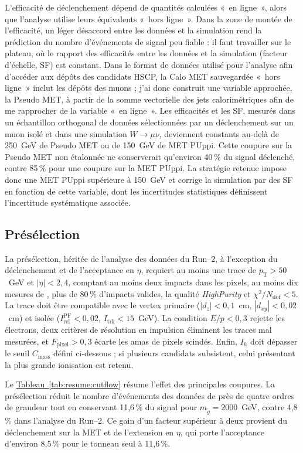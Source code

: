 L'efficacité de déclenchement dépend de quantités calculées «~en ligne~», alors que l'analyse utilise leurs équivalents «~hors ligne~». Dans la zone de montée de l'efficacité, un léger désaccord entre les données et la simulation rend la prédiction du nombre d'événements de signal peu fiable : il faut travailler sur le plateau, où le rapport des efficacités entre les données et la simulation (facteur d'échelle, SF) est constant. Dans le format de données utilisé pour l'analyse afin d'accéder aux dépôts \dedx des candidats HSCP, la Calo MET sauvegardée «~hors ligne~» inclut les dépôts des muons ; j'ai donc construit une variable approchée, la Pseudo MET, à partir de la somme vectorielle des jets calorimétriques afin de me rapprocher de la variable «~en ligne~». Les efficacités et les SF, mesurés dans un échantillon orthogonal de données sélectionnées par un déclenchement sur un muon isolé et dans une simulation $W\to\mu\nu$, deviennent constants au-delà de 250~GeV de Pseudo MET ou de 150~GeV de MET PUppi. Cette coupure sur la Pseudo MET non étalonnée ne conserverait qu'environ 40\,\% du signal déclenché, contre 85\,\% pour une coupure sur la MET PUppi. La stratégie retenue impose donc une MET PUppi supérieure à 150~GeV et corrige la simulation par des SF en fonction de cette variable, dont les incertitudes statistiques définissent l'incertitude systématique associée.

\subsection{Présélection}

La présélection, héritée de l'analyse des données du Run--2, à l'exception du déclenchement et de l'acceptance en $\eta$, requiert au moins une trace de $p_\mathrm{T}>50$~GeV et $|\eta|<2{,}4$, comptant au moins deux impacts dans les pixels, au moins dix mesures de \dedx, plus de 80\,\% d'impacts valides, la qualité \textit{HighPurity} et $\chi^2/N_\mathrm{dof}<5$. La trace doit être compatible avec le vertex primaire ($|d_z|<0{,}1$~cm, $|d_{xy}|<0{,}02$~cm) et isolée ($I_\mathrm{rel}^\mathrm{PF}<0{,}02$, $I_\mathrm{trk}<15$~GeV). La condition $E/p<0{,}3$ rejette les électrons, deux critères de résolution en impulsion éliminent les traces mal mesurées, et $F_\mathrm{pixel}>0{,}3$ écarte les amas de pixels scindés. Enfin, $I_h$ doit dépasser le seuil $C_\mathrm{mass}$ défini ci-dessous ; si plusieurs candidats subsistent, celui présentant la plus grande ionisation est retenu.

Le \hyperref[tab:resume:cutflow]{Tableau~\ref*{tab:resume:cutflow}} résume l'effet des principales coupures. La présélection réduit le nombre d'événements des données de près de quatre ordres de grandeur tout en conservant 11,6\,\% du signal pour $m_{\tilde{g}}=2000$~GeV, contre 4,8\,\% dans l'analyse du Run--2. Ce gain d'un facteur supérieur à deux provient du déclenchement sur la MET et de l'extension en $\eta$, qui porte l'acceptance d'environ 8,5\,\% pour le tonneau seul à 11,6\,\%.

